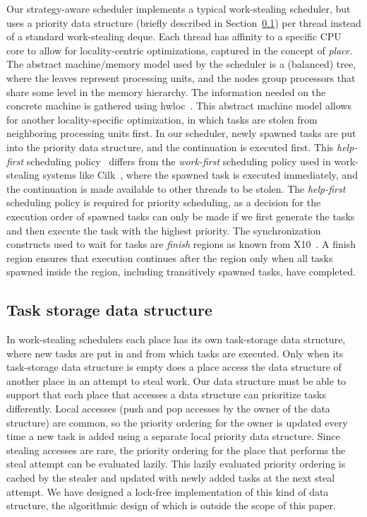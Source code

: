 \documentclass[a4paper,11pt]{article}
\begin{document}
Our strategy-aware scheduler implements a typical work-stealing
scheduler, but uses a priority data structure (briefly described in
Section~\ref{sec:ds}) per thread instead of a standard work-stealing
deque. Each thread has affinity to a specific CPU core to allow for
locality-centric optimizations, captured in the concept of
\emph{place}.  The abstract machine/memory model used by the scheduler
is a (balanced) tree, where the leaves represent processing units, and
the nodes group processors that share some level in the memory
hierarchy.  The information needed on the concrete machine is gathered
using hwloc~\cite{hwloc10}.
This abstract machine model allows for another locality-specific
optimization, in which tasks are stolen from neighboring processing units
first.
In our scheduler, newly spawned tasks are put into the priority
data structure, and the continuation is executed first.  This
\emph{help-first} scheduling policy~\cite{GuoBarik09} differs from the
\emph{work-first} scheduling policy used in work-stealing systems like
Cilk~\cite{Leiserson10}, where the spawned task is executed
immediately, and the continuation is made available to other threads
to be stolen.  The \emph{help-first} scheduling policy is required for
priority scheduling, as a decision for the execution order of spawned
tasks can only be made if we first generate the tasks and then execute
the task with the highest priority.  The synchronization constructs
used to wait for tasks are \emph{finish} regions as known from
X10~\cite{Charles05}. A finish region ensures that execution continues
after the region only when all tasks spawned inside the region,
including transitively spawned tasks, have completed.  



\subsection{Task storage data structure}
\label{sec:ds}

In work-stealing schedulers each place has its own task-storage
data structure, where new tasks are put in and from which tasks are
executed. Only when its task-storage data structure is empty does a place
access the data structure of another place in an attempt to steal
work. Our data structure must be able to support that each place that
accesses a data structure can prioritize tasks differently. Local
accesses (push and pop accesses by the owner of the data structure)
are common, so the priority ordering for the owner is updated every
time a new task is added using a separate local priority
data structure. Since stealing accesses are rare, the priority
ordering for the place that performs the steal attempt can be
evaluated lazily. This lazily evaluated priority ordering is cached by
the stealer and updated with newly added tasks at the next steal
attempt. We have designed a lock-free implementation of this kind of
data structure, the algorithmic design of which is outside the scope
of this paper.
\end{document}
